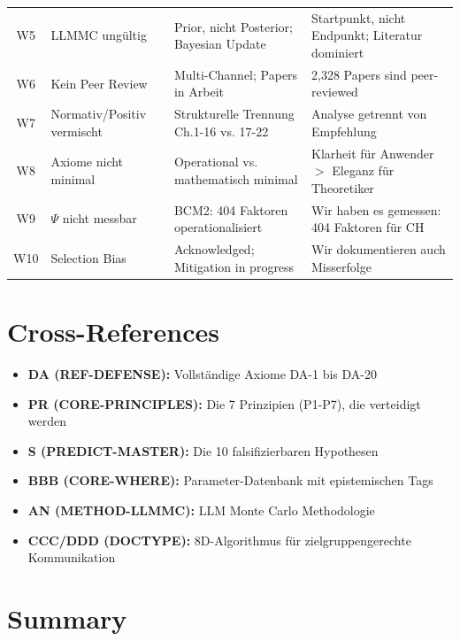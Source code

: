 \begin{table}[htbp]
\begin{tabular}{@{}clp{4cm}p{4cm}@{}}
W5 & LLMMC ungültig & Prior, nicht Posterior; Bayesian Update & Startpunkt, nicht Endpunkt; Literatur dominiert \\
W6 & Kein Peer Review & Multi-Channel; Papers in Arbeit & 2,328 Papers sind peer-reviewed \\
W7 & Normativ/Positiv vermischt & Strukturelle Trennung Ch.1-16 vs. 17-22 & Analyse getrennt von Empfehlung \\
W8 & Axiome nicht minimal & Operational vs. mathematisch minimal & Klarheit für Anwender $>$ Eleganz für Theoretiker \\
W9 & $\Psi$ nicht messbar & BCM2: 404 Faktoren operationalisiert & Wir haben es gemessen: 404 Faktoren für CH \\
W10 & Selection Bias & Acknowledged; Mitigation in progress & Wir dokumentieren auch Misserfolge \\
\bottomrule
\end{tabular}
\end{table}

\section{Cross-References}
\label{sec:da2-crossref}

\begin{itemize}[nosep]
    \item \textbf{DA (REF-DEFENSE):} Vollständige Axiome DA-1 bis DA-20
    \item \textbf{PR (CORE-PRINCIPLES):} Die 7 Prinzipien (P1-P7), die verteidigt werden
    \item \textbf{S (PREDICT-MASTER):} Die 10 falsifizierbaren Hypothesen
    \item \textbf{BBB (CORE-WHERE):} Parameter-Datenbank mit epistemischen Tags
    \item \textbf{AN (METHOD-LLMMC):} LLM Monte Carlo Methodologie
    \item \textbf{CCC/DDD (DOCTYPE):} 8D-Algorithmus für zielgruppengerechte Kommunikation
\end{itemize}

\section{Summary}
\label{sec:da2-summary}

